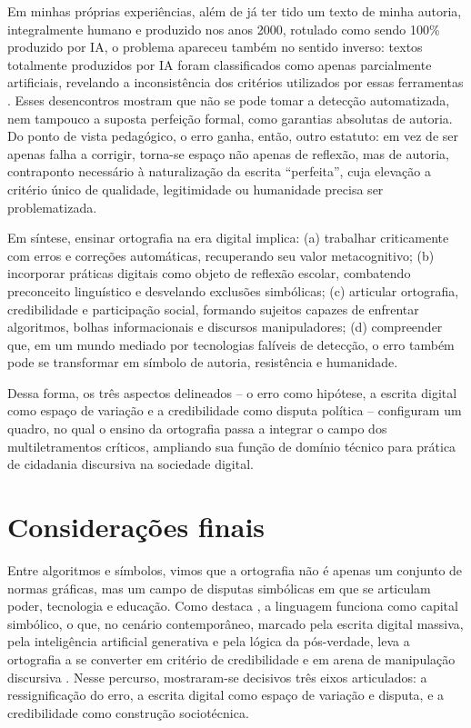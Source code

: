 \documentclass[portuguese]{textolivre}
\begin{document}
Em minhas próprias experiências, além de já ter tido um texto de minha autoria, integralmente humano e produzido nos anos 2000, rotulado como sendo 100\% produzido por IA, o problema apareceu também no sentido inverso: textos totalmente produzidos por IA foram classificados como apenas parcialmente artificiais, revelando a inconsistência dos critérios utilizados por essas ferramentas \cite{mayers2023aidetectors,saha2025almostai}. Esses desencontros mostram que não se pode tomar a detecção automatizada, nem tampouco a suposta perfeição formal, como garantias absolutas de autoria. Do ponto de vista pedagógico, o erro ganha, então, outro estatuto: em vez de ser apenas falha a corrigir, torna-se espaço não apenas de reflexão, mas de autoria, contraponto necessário à naturalização da escrita “perfeita”, cuja elevação a critério único de qualidade, legitimidade ou humanidade precisa ser problematizada.

Em síntese, ensinar ortografia na era digital implica: (a) trabalhar criticamente com erros e correções automáticas, recuperando seu valor metacognitivo; (b) incorporar práticas digitais como objeto de reflexão escolar, combatendo preconceito linguístico e desvelando exclusões simbólicas; (c) articular ortografia, credibilidade e participação social, formando sujeitos capazes de enfrentar algoritmos, bolhas informacionais e discursos manipuladores; (d) compreender que, em um mundo mediado por tecnologias falíveis de detecção, o erro também pode se transformar em símbolo de autoria, resistência e humanidade.

Dessa forma, os três aspectos delineados – o erro como hipótese, a escrita digital como espaço de variação e a credibilidade como disputa política – configuram um quadro, no qual o ensino da ortografia passa a integrar o campo dos multiletramentos críticos, ampliando sua função de domínio técnico para prática de cidadania discursiva na sociedade digital.


\section{Considerações finais}\label{sec-formato}
Entre algoritmos e símbolos, vimos que a ortografia não é apenas um conjunto de normas gráficas, mas um campo de disputas simbólicas em que se articulam poder, tecnologia e educação. Como destaca \textcite{bourdieu1991language}, a linguagem funciona como capital simbólico, o que, no cenário contemporâneo, marcado pela escrita digital massiva, pela inteligência artificial generativa e pela lógica da pós-verdade, leva a ortografia a se converter em critério de credibilidade e em arena de manipulação discursiva \cite{kalantzis2005learning,fazio2015illusorytruth}. Nesse percurso, mostraram-se decisivos três eixos articulados: a ressignificação do erro, a escrita digital como espaço de variação e disputa, e a credibilidade como construção sociotécnica.
\end{document}
